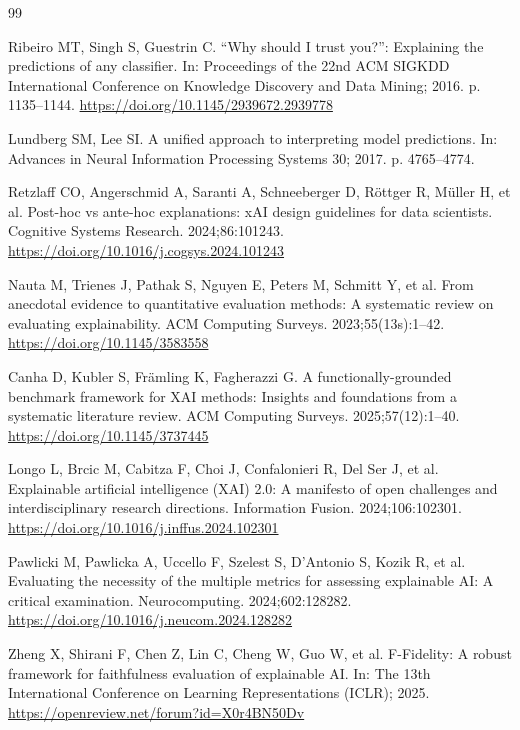 \documentclass[11pt,a4paper]{article}
\begin{document}
\begin{thebibliography}{99}

Ribeiro MT, Singh S, Guestrin C. ``Why should I trust you?'': Explaining the
predictions of any classifier. In: Proceedings of the 22nd ACM SIGKDD
International Conference on Knowledge Discovery and Data Mining; 2016.
p. 1135--1144. \url{https://doi.org/10.1145/2939672.2939778}

Lundberg SM, Lee SI. A unified approach to interpreting model predictions.
In: Advances in Neural Information Processing Systems 30; 2017. p. 4765--4774.

Retzlaff CO, Angerschmid A, Saranti A, Schneeberger D, R\"{o}ttger R,
M\"{u}ller H, et al. Post-hoc vs ante-hoc explanations: xAI design guidelines
for data scientists. Cognitive Systems Research. 2024;86:101243.
\url{https://doi.org/10.1016/j.cogsys.2024.101243}

Nauta M, Trienes J, Pathak S, Nguyen E, Peters M, Schmitt Y, et al. From
anecdotal evidence to quantitative evaluation methods: A systematic review on
evaluating explainability. ACM Computing Surveys. 2023;55(13s):1--42.
\url{https://doi.org/10.1145/3583558}

Canha D, Kubler S, Fr\"{a}mling K, Fagherazzi G. A functionally-grounded
benchmark framework for XAI methods: Insights and foundations from a
systematic literature review. ACM Computing Surveys. 2025;57(12):1--40.
\url{https://doi.org/10.1145/3737445}

Longo L, Brcic M, Cabitza F, Choi J, Confalonieri R, Del Ser J, et al.
Explainable artificial intelligence (XAI) 2.0: A manifesto of open challenges
and interdisciplinary research directions. Information Fusion.
2024;106:102301. \url{https://doi.org/10.1016/j.inffus.2024.102301}

Pawlicki M, Pawlicka A, Uccello F, Szelest S, D'Antonio S, Kozik R, et al.
Evaluating the necessity of the multiple metrics for assessing explainable
AI: A critical examination. Neurocomputing. 2024;602:128282.
\url{https://doi.org/10.1016/j.neucom.2024.128282}

Zheng X, Shirani F, Chen Z, Lin C, Cheng W, Guo W, et al. F-Fidelity: A
robust framework for faithfulness evaluation of explainable AI. In: The 13th
International Conference on Learning Representations (ICLR); 2025.
\url{https://openreview.net/forum?id=X0r4BN50Dv}


\end{thebibliography}
\end{document}
